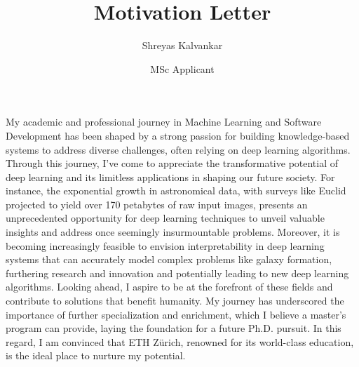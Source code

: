 \documentclass{article}
\title{Motivation Letter}
\author{Shreyas Kalvankar}
\date{MSc Applicant}
\begin{document}
  \maketitle%
  \thispagestyle{empty}
\vspace{5pt}
\hspace{0.25in}My academic and professional journey in Machine Learning and Software
Development has been shaped by a strong passion for building knowledge-based
systems to address diverse challenges, often relying on deep learning
algorithms. Through this journey, I've come to appreciate the transformative
potential of deep learning and its limitless applications in shaping our future
society. For instance, the exponential growth in astronomical data, with surveys
like Euclid projected to yield over 170 petabytes of raw input images, presents
an unprecedented opportunity for deep learning techniques to unveil valuable
insights and address once seemingly insurmountable problems. Moreover, it is
becoming increasingly feasible to envision interpretability in deep learning
systems that can accurately model complex problems like galaxy formation,
furthering research and innovation and potentially leading to new deep learning
algorithms. Looking ahead, I aspire to be at the forefront of these fields and
contribute to solutions that benefit humanity. My journey has underscored the
importance of further specialization and enrichment, which I believe a master's
program can provide, laying the foundation for a future Ph.D. pursuit. In this
regard, I am convinced that ETH Zürich, renowned for its world-class education,
is the ideal place to nurture my potential.
\vspace{5pt}
\end{document}
